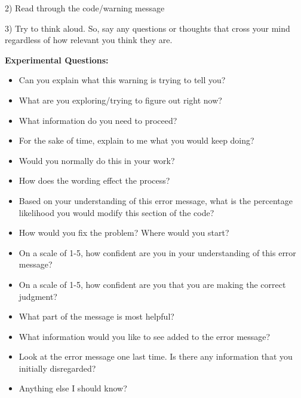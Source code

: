 \documentclass[10pt,journal,compsoc]{IEEEtran}
\begin{document}
2) Read through the code/warning message

3) Try to think aloud. So, say any questions or thoughts that cross your mind regardless of
how relevant you think they are. 

\textbf{Experimental Questions:} 
\begin{itemize}
\item Can you explain what this warning is trying to tell you?

\item What are you exploring/trying to figure out right now?

\item What information do you need to proceed?

\item For the sake of time, explain to me what you would keep doing?

\item Would you normally do this in your work?

\item How does the wording effect the process?

\item Based on your understanding of this error message, what is the percentage likelihood you would modify this section of the code?

\item How would you fix the problem? Where would you start?

\item On a scale of 1-5, how confident are you in your understanding of this error message?

\item On a scale of 1-5, how confident are you that you are making the correct judgment?

\item What part of the message is most helpful?

\item What information would you like to see added to the error message?

\item Look at the error message one last time. Is there any information that you initially disregarded?

\item Anything else I should know?
\end{itemize}
\end{document}
